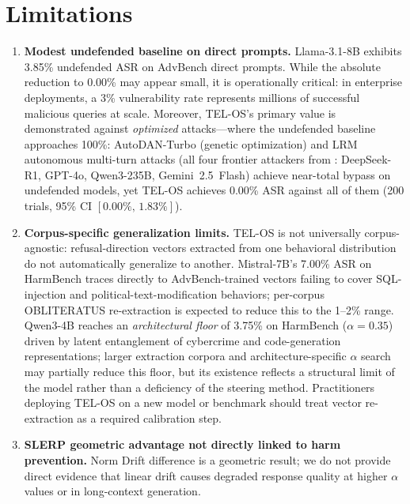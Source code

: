 \documentclass{article}
\begin{document}
\section{Limitations}
\label{sec:limitations}

\begin{enumerate}
    \item \textbf{Modest undefended baseline on direct prompts.}
    Llama-3.1-8B exhibits 3.85\% undefended ASR on AdvBench direct prompts.
    While the absolute reduction to 0.00\% may appear small, it is operationally
    critical: in enterprise deployments, a 3\% vulnerability rate represents
    millions of successful malicious queries at scale.
    Moreover, TEL-OS's primary value is demonstrated against \textit{optimized}
    attacks---where the undefended baseline approaches 100\%:
    AutoDAN-Turbo (genetic optimization) and LRM autonomous multi-turn attacks
    (all four frontier attackers from \citet{hagendorff2026lrm}: DeepSeek-R1,
    GPT-4o, Qwen3-235B, Gemini~2.5~Flash) achieve near-total bypass on
    undefended models, yet TEL-OS achieves 0.00\% ASR against all of them
    (200 trials, 95\% CI $[0.00\%,\,1.83\%]$).

    \item \textbf{Corpus-specific generalization limits.}
    TEL-OS is not universally corpus-agnostic: refusal-direction vectors extracted
    from one behavioral distribution do not automatically generalize to another.
    Mistral-7B's 7.00\% ASR on HarmBench traces directly to AdvBench-trained vectors
    failing to cover SQL-injection and political-text-modification behaviors;
    per-corpus \textsc{OBLITERATUS} re-extraction is expected to reduce this to
    the 1--2\% range.
    Qwen3-4B reaches an \textit{architectural floor} of 3.75\% on HarmBench
    ($\alpha{=}0.35$) driven by latent entanglement of cybercrime and code-generation
    representations; larger extraction corpora and architecture-specific $\alpha$
    search may partially reduce this floor, but its existence reflects a structural
    limit of the model rather than a deficiency of the steering method.
    Practitioners deploying TEL-OS on a new model or benchmark should treat
    vector re-extraction as a required calibration step.

    \item \textbf{SLERP geometric advantage not directly linked to harm prevention.}
    Norm Drift difference is a geometric result; we do not provide direct evidence
    that linear drift causes degraded response quality at higher $\alpha$ values or
    in long-context generation.


\end{enumerate}
\end{document}
